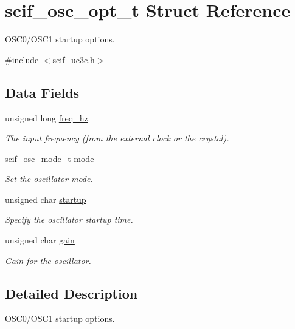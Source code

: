 \hypertarget{structscif__osc__opt__t}{
\section{scif\-\_\-osc\-\_\-opt\-\_\-t \-Struct \-Reference}
\label{structscif__osc__opt__t}
}


\-O\-S\-C0/\-O\-S\-C1 startup options.  




{\ttfamily \#include $<$scif\-\_\-uc3c.\-h$>$}

\subsection*{\-Data \-Fields}
\begin{DoxyCompactItemize}
\item 
unsigned long \hyperlink{structscif__osc__opt__t_a6a60d571530d7b7eabe0cf5eefe6fe7a}{freq\-\_\-hz}
\begin{DoxyCompactList}\small\item\em \-The input frequency (from the external clock or the crystal). \end{DoxyCompactList}\item 
\hyperlink{scif__uc3c_8h_a9a708e94c5df197717f5859f6b8b257c}{scif\-\_\-osc\-\_\-mode\-\_\-t} \hyperlink{structscif__osc__opt__t_a1cd9d6f0cb38d71a344fbdab1fe90337}{mode}
\begin{DoxyCompactList}\small\item\em \-Set the oscillator mode. \end{DoxyCompactList}\item 
unsigned char \hyperlink{structscif__osc__opt__t_aa056d244d7d751361c02bd7d29c06b69}{startup}
\begin{DoxyCompactList}\small\item\em \-Specify the oscillator startup time. \end{DoxyCompactList}\item 
unsigned char \hyperlink{structscif__osc__opt__t_a6642c00d5955b3fb3a2cbd3320977f23}{gain}
\begin{DoxyCompactList}\small\item\em \-Gain for the oscillator. \end{DoxyCompactList}\end{DoxyCompactItemize}


\subsection{\-Detailed \-Description}
\-O\-S\-C0/\-O\-S\-C1 startup options. 

